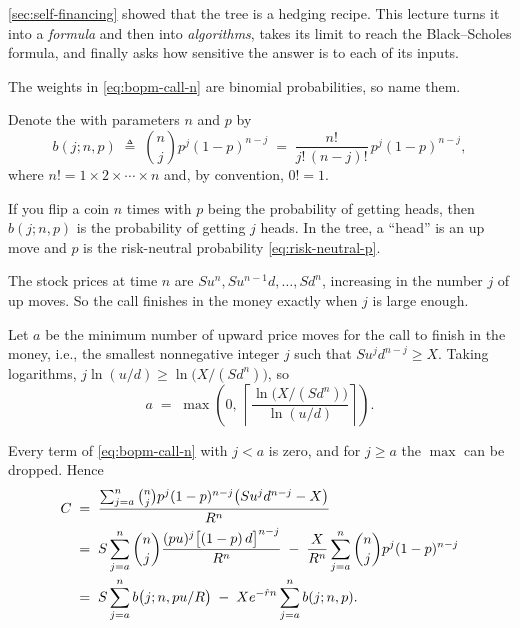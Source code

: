 
\suppstart
\autoref{sec:self-financing} showed that the tree is a hedging recipe.
This lecture turns it into a \emph{formula} and then into \emph{algorithms}, takes its limit to reach the Black--Scholes formula, and finally asks how sensitive the answer is to each of its inputs.
\suppend

\suppstart
The weights in \eqref{eq:bopm-call-n} are binomial probabilities, so name them.
\suppend

\begin{definition}
	Denote the  with parameters $n$ and $p$ by
	\[
		b(j;n,p) \;\triangleq\; \binom{n}{j}p^{j}(1-p)^{n-j} \;=\; \frac{n!}{j!\,(n-j)!}\,p^{j}(1-p)^{n-j} ,
	\]
	where $n!=1\times2\times\cdots\times n$ and, by convention, $0!=1$.
\end{definition}

If you flip a coin $n$ times with $p$ being the probability of getting heads, then $b(j;n,p)$ is the probability of getting $j$ heads.
\suppstart
In the tree, a ``head'' is an up move and $p$ is the risk-neutral probability \eqref{eq:risk-neutral-p}.
\suppend


The stock prices at time $n$ are $Su^{n},Su^{n-1}d,\ldots,Sd^{n}$, increasing in the number $j$ of up moves.
\suppstart
So the call finishes in the money exactly when $j$ is large enough.
\suppend

\begin{definition}
	Let $a$ be the minimum number of upward price moves for the call to finish in the money, i.e., the smallest nonnegative integer $j$ such that $Su^{j}d^{n-j}\ge X$.
	\suppstart
	Taking logarithms, $j\ln(u/d)\ge\ln\bigl(X/(Sd^{n})\bigr)$, so
	\suppend
	\begin{equation}
		a \;=\; \max\left(0,\ \left\lceil\frac{\ln\bigl(X/(Sd^{n})\bigr)}{\ln(u/d)}\right\rceil\right) .
		\label{eq:bopm-a}
	\end{equation}
\end{definition}

\suppstart
Every term of \eqref{eq:bopm-call-n} with $j<a$ is zero, and for $j\ge a$ the $\max$ can be dropped.
\suppend
Hence
\begin{align}
	C & \;=\; \frac{\sum_{j=a}^{n}\binom{n}{j}p^{j}(1-p)^{n-j}\bigl(Su^{j}d^{n-j}-X\bigr)}{R^{n}}
	\label{eq:bopm-call-a} \\
	  & \;=\; S\sum_{j=a}^{n}\binom{n}{j}\frac{(pu)^{j}\bigl[(1-p)\,d\bigr]^{n-j}}{R^{n}}
	\;-\; \frac{X}{R^{n}}\sum_{j=a}^{n}\binom{n}{j}p^{j}(1-p)^{n-j}
	\notag \\
	  & \;=\; S\sum_{j=a}^{n}b\bigl(j;n,pu/R\bigr) \;-\; Xe^{-\hat{r}n}\sum_{j=a}^{n}b(j;n,p) .
	\label{eq:bopm-formula}
\end{align}

